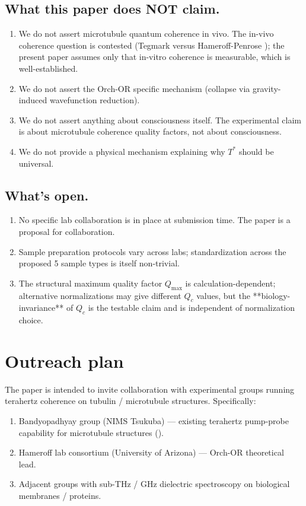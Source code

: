 \documentclass[11pt,reqno]{amsart}
\theoremstyle{plain}
\theoremstyle{definition}
\theoremstyle{remark}
\begin{document}
\subsection{What this paper does NOT claim.}
\begin{enumerate}
\item We do not assert microtubule quantum coherence in vivo. The
in-vivo coherence question is contested (Tegmark
\cite{Tegmark2000} versus Hameroff-Penrose
\cite{HameroffPenrose2014}); the present paper assumes only that
in-vitro coherence is measurable, which is well-established.
\item We do not assert the Orch-OR specific mechanism (collapse via
gravity-induced wavefunction reduction).
\item We do not assert anything about consciousness itself. The
experimental claim is about microtubule coherence quality factors,
not about consciousness.
\item We do not provide a physical mechanism explaining why $T^{*}$
should be universal.
\end{enumerate}

\subsection{What's open.}
\begin{enumerate}
\item No specific lab collaboration is in place at submission time.
The paper is a proposal for collaboration.
\item Sample preparation protocols vary across labs; standardization
across the proposed 5 sample types is itself non-trivial.
\item The structural maximum quality factor $Q_\text{max}$ is
calculation-dependent; alternative normalizations may give different
$Q_c$ values, but the **biology-invariance** of $Q_c$ is the testable
claim and is independent of normalization choice.
\end{enumerate}

\section{Outreach plan}

The paper is intended to invite collaboration with experimental groups
running terahertz coherence on tubulin / microtubule structures.
Specifically:
\begin{enumerate}
\item Bandyopadhyay group (NIMS Tsukuba) --- existing terahertz pump-probe
capability for microtubule structures (\cite{Bandyopadhyay2013, Sahu2013}).
\item Hameroff lab consortium (University of Arizona) --- Orch-OR
theoretical lead.
\item Adjacent groups with sub-THz / GHz dielectric spectroscopy
on biological membranes / proteins.
\end{enumerate}
\end{document}
